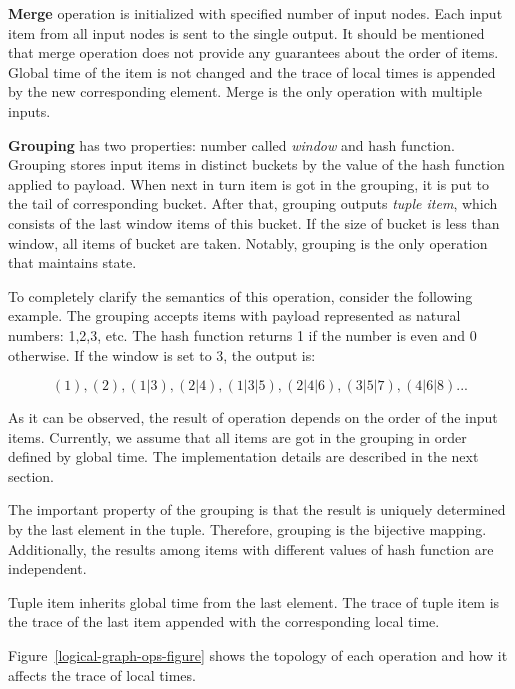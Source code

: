 {\bf Merge} operation is initialized with specified number of input nodes. Each input item from all input nodes is sent to the single output. It should be mentioned that merge operation does not provide any guarantees about the order of items. Global time of the item is not changed and the trace of local times is appended by the new corresponding element. Merge is the only operation with multiple inputs.

{\bf Grouping} has two properties: number called {\it window} and hash function. Grouping stores input items in distinct buckets by the value of the hash function applied to payload. When next in turn item is got in the grouping, it is put to the tail of corresponding bucket. After that, grouping outputs {\it tuple item}, which consists of the last window items of this bucket. If the size of bucket is less than window, all items of bucket are taken. Notably, grouping is the only operation that maintains state.
	
To completely clarify the semantics of this operation, consider the following example. The grouping accepts items with payload represented as natural numbers: 1,2,3, etc. The hash function returns 1 if the number is even and 0 otherwise. If the window is set to 3, the output is:

\[(1), (2), (1|3), (2|4), (1|3|5), (2|4|6), (3|5|7), (4|6|8)...\]

As it can be observed, the result of operation depends on the order of the input items. Currently, we assume that all items are got in the grouping in order defined by global time. The implementation details are described in the next section. 

The important property of the grouping is that the result is uniquely determined by the last element in the tuple. Therefore, grouping is the bijective mapping. Additionally, the results among items with different values of hash function are independent.

Tuple item inherits global time from the last element. The trace of tuple item is the trace of the last item appended with the corresponding local time.  

Figure~\ref{logical-graph-ops-figure} shows the topology of each operation and how it affects the trace of local times.

